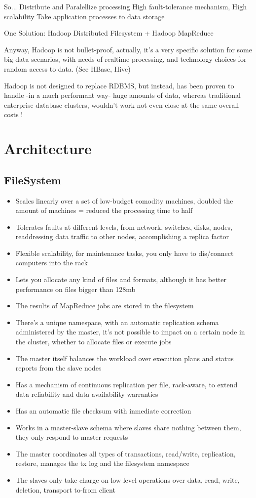 \documentclass[12pt, right open]{memoir}
\begin{document}
So...
Distribute and Paralellize processing
High fault-tolerance mechanism, High scalability
Take application processes to data storage

One Solution: Hadoop Distributed Filesystem + Hadoop MapReduce

Anyway, Hadoop is not bullet-proof, actually, it's a very specific solution for some big-data scenarios, with needs of realtime processing, and technology choices for random access to data. (See HBase, Hive)

Hadoop is not designed to replace RDBMS, but instead, has been proven to handle -in a much performant way- huge amounts of data, whereas traditional enterprise database clusters, wouldn't work not even close at the same overall costs !

\chapter{Architecture}

\section{FileSystem}
\begin{itemize}
\item Scales linearly over a set of low-budget comodity machines, doubled the amount of machines = reduced the processing time to half
\item Tolerates faults at different levels, from network, switches, disks, nodes, readdressing data traffic to other nodes, accomplishing a replica factor
\item Flexible scalability, for maintenance tasks, you only have to dis/connect computers into the rack
\item Lets you allocate any kind of files and formats, although it has better performance on files bigger than 128mb
\item The results of MapReduce jobs are stored in the filesystem
\item There's a unique namespace, with an automatic replication schema administered by the master, it's not possible to impact on a certain node in the cluster, whether to allocate files or execute jobs
\item The master itself balances the workload over execution plans and status reports from the slave nodes
\item Has a mechanism of continuous replication per file, rack-aware, to extend data reliability and data availability warranties
\item Has an automatic file checksum with inmediate correction
\item Works in a master-slave schema where slaves share nothing between them, they only respond to master requests
\item The master coordinates all types of transactions, read/write, replication, restore, manages the tx log and the filesystem namespace
\item The slaves only take charge on low level operations over data, read, write, deletion, transport to-from client
\end{itemize}
\end{document}
